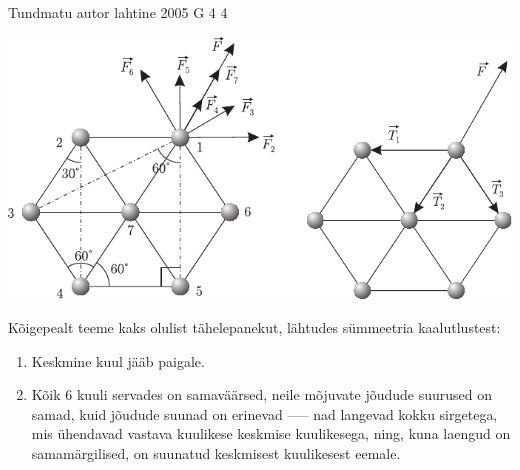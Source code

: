 \documentclass[11pt, twoside]{article}
\begin{document}
{%
{Tundmatu autor} %
{lahtine} %
{2005} %
{G 4} %
{4} %
{

\ifSolution
\begin{center}
	\includegraphics[width=\linewidth]{2005-lahg-04-lah}
\end{center}

Kõigepealt teeme kaks olulist tähelepanekut, lähtudes sümmeetria kaalutlustest:
\begin{enumerate}[wide=0pt, label={\arabic*)}]
	\item Keskmine kuul jääb paigale.
	\item Kõik 6 kuuli servades on samaväärsed, neile mõjuvate jõudude suurused on samad, kuid jõudude suunad on erinevad –--- nad langevad kokku sirgetega, mis ühendavad vastava kuulikese keskmise kuulikesega, ning, kuna laengud on samamärgilised, on suunatud keskmisest kuulikesest eemale.
\end{enumerate}

}}
\end{document}
